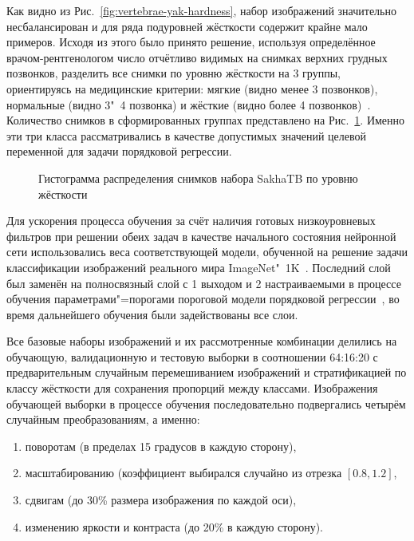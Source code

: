 Как видно из Рис.~\ref{fig:vertebrae-yak-hardness}, набор изображений значительно несбалансирован и для ряда подуровней жёсткости содержит крайне мало примеров. Исходя из этого было принято решение, используя определённое врачом-рентгенологом число отчётливо видимых на снимках верхних грудных позвонков, разделить все снимки по уровню жёсткости на 3 группы, ориентируясь на медицинские критерии: мягкие (видно менее 3 позвонков), нормальные (видно 3"~4 позвонка) и жёсткие (видно более 4 позвонков)~\cite{тимофеева2013основные, сидоров2012методика}. Количество снимков в сформированных группах представлено на Рис.~\ref{fig:hardness-yak-hardness}. Именно эти три класса рассматривались в качестве допустимых значений целевой переменной для задачи порядковой регрессии.

\begin{figure}[ht]
	\caption{Гистограмма распределения снимков набора SakhaTB по уровню жёсткости}
	\label{fig:hardness-yak-hardness}
\end{figure}

Для ускорения процесса обучения за счёт наличия готовых низкоуровневых фильтров при решении обеих задач в качестве начального состояния нейронной сети использовались веса соответствующей модели, обученной на решение задачи классификации изображений реального мира ImageNet"~1K~\cite{russakovsky2015imagenet}. Последний слой был заменён на полносвязный слой с 1 выходом и 2 настраиваемыми в процессе обучения параметрами"=порогами пороговой модели порядковой регрессии~\cite{rennie2005loss}, во время дальнейшего обучения были задействованы все слои.

Все базовые наборы изображений и их рассмотренные комбинации делились на обучающую, валидационную и тестовую выборки в соотношении 64:16:20 с предварительным случайным перемешиванием изображений и стратификацией по классу жёсткости для сохранения пропорций между классами. Изображения обучающей выборки в процессе обучения последовательно подвергались четырём случайным преобразованиям, а именно:
\begin{enumerate}[beginpenalty=10000]
	\item поворотам (в пределах 15 градусов в каждую сторону),
	\item масштабированию (коэффициент выбирался случайно из отрезка $\left[ 0.8, 1.2 \right]$,
	\item сдвигам (до 30\% размера изображения по каждой оси),
	\item изменению яркости и контраста (до 20\% в каждую сторону).
\end{enumerate}

